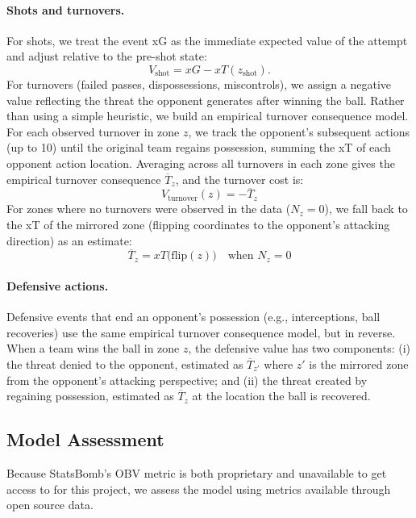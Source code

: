 \documentclass[12pt,a4paper]{article}
\begin{document}
\paragraph{Shots and turnovers.}
For shots, we treat the event xG as the immediate expected value of the attempt and adjust relative to the pre-shot state:
\begin{equation}
V_{\text{shot}} = xG - xT(z_{\text{shot}}).
\end{equation}
For turnovers (failed passes, dispossessions, miscontrols), we assign a negative value reflecting the threat the opponent generates after winning the ball. Rather than using a simple heuristic, we build an empirical turnover consequence model. For each observed turnover in zone $z$, we track the opponent’s subsequent actions (up to 10) until the original team regains possession, summing the xT of each opponent action location. Averaging across all turnovers in each zone gives the empirical turnover consequence $\overline{T}_z$, and the turnover cost is:
\begin{equation}
V_{\text{turnover}}(z) = -\overline{T}_z
\end{equation}
For zones where no turnovers were observed in the data ($N_z = 0$), we fall back to the xT of the mirrored zone (flipping coordinates to the opponent’s attacking direction) as an estimate:
\begin{equation}
\overline{T}_z = xT\bigl(\text{flip}(z)\bigr) \quad \text{when } N_z = 0
\end{equation}

\paragraph{Defensive actions.}
Defensive events that end an opponent’s possession (e.g., interceptions, ball recoveries) use the same empirical turnover consequence model, but in reverse. When a team wins the ball in zone $z$, the defensive value has two components: (i) the threat denied to the opponent, estimated as $\overline{T}_{z'}$ where $z'$ is the mirrored zone from the opponent’s attacking perspective; and (ii) the threat created by regaining possession, estimated as $\overline{T}_z$ at the location the ball is recovered.

\subsection{Model Assessment}\label{sec:calibration}
Because StatsBomb's OBV metric is both proprietary and unavailable to get access to for this project, we assess the model using metrics available through open source data.
\end{document}
